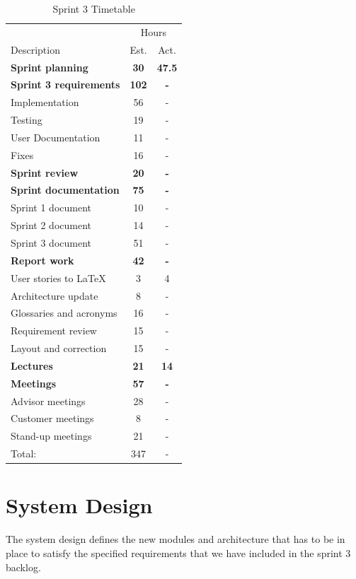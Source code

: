 \begin{table}[!htb] \small \center
\caption{Sprint 3 Timetable\label{tab:sprint3time}}
\begin{tabularx}{\textwidth}{X c c}
	\toprule
	& \multicolumn{2}{c}{Hours} \\
	\cmidrule(r){2-3}
	Description & Est. & Act. \\
	\midrule
	\textbf{Sprint planning} & \textbf{30} & \textbf{47.5} \\
	\addlinespace
	\textbf{Sprint 3 requirements} & \textbf{102} & \textbf{-} \\
	Implementation & 56 & - \\
	Testing & 19 & - \\
	User Documentation & 11 & - \\
	Fixes & 16 & - \\
	\addlinespace
	\textbf{Sprint review} & \textbf{20} & \textbf{-} \\
	\addlinespace
	\textbf{Sprint documentation} & \textbf{75} & \textbf{-} \\
	Sprint 1 document & 10 & -\\
	Sprint 2 document & 14 & - \\
	Sprint 3 document & 51 & - \\
	\addlinespace
	\textbf{Report work} & \textbf{42} & \textbf{-} \\
	User stories to LaTeX & 3 & 4\\
	Architecture update & 8 & -\\
	Glossaries and acronyms & 16 & -\\
	Requirement review & 15 & -\\
	Layout and correction & 15 & -\\
	\addlinespace
	\textbf{Lectures} & \textbf{21} & \textbf{14} \\
	\addlinespace
	\textbf{Meetings} & \textbf{57} & \textbf{-} \\
	Advisor meetings & 28 & - \\
	Customer meetings & 8 & - \\
	Stand-up meetings & 21 & - \\
	\midrule
	Total: & 347 & - \\
	\bottomrule
\end{tabularx}
\end{table}



\section{System Design}
The system design defines the new modules and architecture that has to be in place to satisfy the specified requirements that we have included in the sprint 3 backlog.\\

